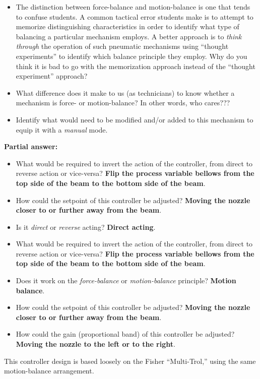 \begin{itemize}
\item{} The distinction between force-balance and motion-balance is one that tends to confuse students.  A common tactical error students make is to attempt to memorize distinguishing characteristics in order to identify what type of balancing a particular mechanism employs.  A better approach is to {\it think through} the operation of such pneumatic mechanisms using ``thought experiments'' to identify which balance principle they employ.  Why do you think it is bad to go with the memorization approach instead of the ``thought experiment'' approach?
\item{} What difference does it make to us (as technicians) to know whether a mechanism is force- or motion-balance?  In other words, who cares???
\item{} Identify what would need to be modified and/or added to this mechanism to equip it with a {\it manual} mode.
\end{itemize}







\noindent
{\bf Partial answer:}

\vskip 10pt

\begin{itemize}
\item{} What would be required to invert the action of the controller, from direct to reverse action or vice-versa? {\bf Flip the process variable bellows from the top side of the beam to the bottom side of the beam}.
\vskip 5pt
\item{} How could the setpoint of this controller be adjusted? {\bf Moving the nozzle closer to or further away from the beam}.
\end{itemize}








\begin{itemize}
\item{} Is it {\it direct} or {\it reverse} acting? {\bf Direct acting}.
\vskip 5pt
\item{} What would be required to invert the action of the controller, from direct to reverse action or vice-versa? {\bf Flip the process variable bellows from the top side of the beam to the bottom side of the beam}.
\vskip 5pt
\item{} Does it work on the {\it force-balance} or {\it motion-balance} principle? {\bf Motion balance}.
\vskip 5pt
\item{} How could the setpoint of this controller be adjusted? {\bf Moving the nozzle closer to or further away from the beam}.
\vskip 5pt
\item{} How could the gain (proportional band) of this controller be adjusted? {\bf Moving the nozzle to the left or to the right}.
\end{itemize}

\vskip 10pt

This controller design is based loosely on the Fisher ``Multi-Trol,'' using the same motion-balance arrangement.




